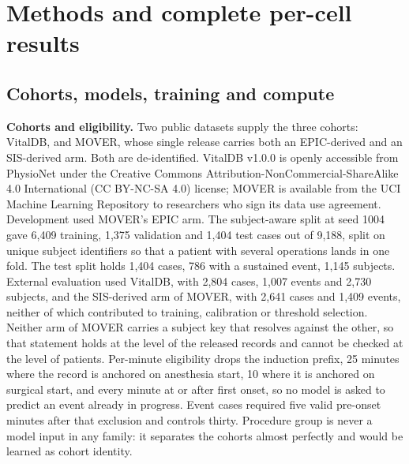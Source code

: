 \clearpage
\appendix
\raggedbottom
\renewcommand{\thesection}{Appendix \Alph{section}}
\renewcommand{\thesubsection}{\Alph{section}.\arabic{subsection}}
\setcounter{figure}{0}
\renewcommand{\thefigure}{A\arabic{figure}}
\renewcommand{\theHfigure}{A\arabic{figure}}
\section{Methods and complete per-cell results}

\subsection{Cohorts, models, training and compute}\label{cohorts-models-training-and-compute}

\textbf{Cohorts and eligibility.} Two public datasets supply the three cohorts: VitalDB, and
MOVER, whose single release carries both an EPIC-derived and an SIS-derived arm. Both are de-identified. VitalDB v1.0.0 is openly accessible from PhysioNet under the Creative Commons Attribution-NonCommercial-ShareAlike 4.0 International (CC BY-NC-SA 4.0) license; MOVER is available from the UCI Machine Learning Repository to researchers who sign its data use agreement. Development
used MOVER's EPIC arm. The subject-aware split at
seed 1004 gave 6,409 training, 1,375 validation and 1,404 test cases
out of 9,188, split on unique subject identifiers so that a patient with several operations
lands in one fold. The test split holds 1,404 cases, 786 with a sustained event, 1,145 subjects.
External evaluation used VitalDB, with 2,804 cases, 1,007 events and 2,730 subjects, and the
SIS-derived arm of MOVER, with 2,641 cases and 1,409 events, neither of which contributed to training, calibration or threshold selection. Neither arm of MOVER carries a subject key that resolves against the other, so that statement holds at the level of the released records and cannot be checked at the level of patients. Per-minute eligibility
drops the induction prefix, 25 minutes where the record is anchored on anesthesia start, 10
where it is anchored on surgical start, and every minute at or after first onset, so no
model is asked to predict an event already in progress. Event cases required five valid
pre-onset minutes after that exclusion and controls thirty. Procedure group is never a model
input in any family: it separates the cohorts almost perfectly and would be learned as cohort
identity.

